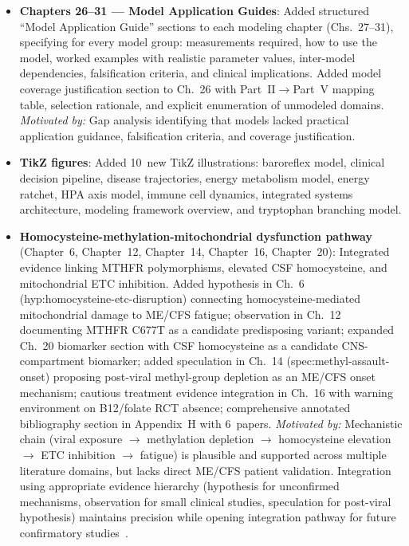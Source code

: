 \begin{itemize}
  \item \textbf{Chapters 26--31 --- Model Application Guides}: Added structured
    ``Model Application Guide'' sections to each modeling chapter
    (Chs.~27--31), specifying for every model group: measurements required,
    how to use the model, worked examples with realistic parameter values,
    inter-model dependencies, falsification criteria, and clinical
    implications. Added model coverage justification section to Ch.~26
    with Part~II$\to$Part~V mapping table, selection rationale, and explicit
    enumeration of unmodeled domains.
    \textit{Motivated by:} Gap analysis identifying that models lacked
    practical application guidance, falsification criteria, and coverage
    justification.

  \item \textbf{TikZ figures}: Added 10~new TikZ illustrations: baroreflex
    model, clinical decision pipeline, disease trajectories, energy metabolism
    model, energy ratchet, HPA axis model, immune cell dynamics, integrated
    systems architecture, modeling framework overview, and tryptophan branching
    model.

  \item \textbf{Homocysteine-methylation-mitochondrial dysfunction pathway}
    (Chapter~6, Chapter~12, Chapter~14, Chapter~16, Chapter~20): Integrated
    evidence linking MTHFR polymorphisms, elevated CSF homocysteine, and
    mitochondrial ETC inhibition. Added hypothesis in Ch.~6 (hyp:homocysteine-etc-disruption)
    connecting homocysteine-mediated mitochondrial damage to ME/CFS fatigue;
    observation in Ch.~12 documenting MTHFR C677T as a candidate predisposing
    variant; expanded Ch.~20 biomarker section with CSF homocysteine as a
    candidate CNS-compartment biomarker; added speculation in Ch.~14
    (spec:methyl-assault-onset) proposing post-viral methyl-group depletion as
    an ME/CFS onset mechanism; cautious treatment evidence integration in Ch.~16
    with warning environment on B12/folate RCT absence; comprehensive annotated
    bibliography section in Appendix~H with 6~papers.
    \textit{Motivated by:} Mechanistic chain (viral exposure $\to$ methylation
    depletion $\to$ homocysteine elevation $\to$ ETC inhibition $\to$ fatigue) is
    plausible and supported across multiple literature domains, but lacks direct
    ME/CFS patient validation. Integration using appropriate evidence hierarchy
    (hypothesis for unconfirmed mechanisms, observation for small clinical
    studies, speculation for post-viral hypothesis) maintains precision while
    opening integration pathway for future confirmatory studies~\cite{Kaplan2020,Regland1997,Regland2015,vanCampen2019,Zarembska2023,McCaddon2021,Liao2021,Maksoud2023}.

\end{itemize}

